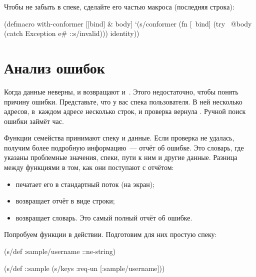 Чтобы не забыть  в спеке, сделайте его частью макроса
 (последняя строка):


\begin{clojure}
(defmacro with-conformer
  [[bind] & body]
  `(s/conformer
    (fn [~bind]
      (try
        ~@body
        (catch Exception e#
          ::s/invalid)))
    identity))
\end{clojure}


\section{Анализ ошибок}


\label{spec-explain}

Когда данные неверны,  и  возвращают 
и~. Этого недостаточно, чтобы понять причину
ошибки. Представьте, что у вас спека пользователя. В ней несколько адресов,
в~каждом адресе несколько строк, и проверка вернула . Ручной поиск
ошибки займёт час.

Функции семейства  принимают спеку и данные. Если проверка не
удалась, получим более подробную информацию~--- отчёт об ошибке. Это словарь,
где указаны проблемные значения, спеки, пути к ним и другие данные. Разница
между функциями в том, как они поступают с отчётом:

\begin{itemize}


\item
   печатает его в стандартный поток (на экран);

\item
   возвращает отчёт в виде строки;

\item
   возвращает словарь. Это самый полный отчёт об ошибке.

\end{itemize}

Попробуем функции в действии. Подготовим для них простую спеку:


\begin{clojure}
(s/def :sample/username ::ne-string)

(s/def ::sample
  (s/keys :req-un [:sample/username]))
\end{clojure}


